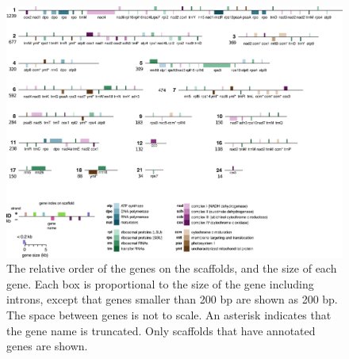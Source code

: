 \documentclass[
  12pt,
  oneside,
  openany]{book}
\begin{document}
\begin{figure}
\hypertarget{fig:mtgenes}{%
\centering
\includegraphics{whitespruce/mt-gene-order.png}
\caption[The relative order of the genes on the scaffolds, and the size of each gene.]{The relative order of the genes on the scaffolds, and the size of each gene. Each box is proportional to the size of the gene including introns, except that genes smaller than 200 bp are shown as 200 bp. The space between genes is not to scale. An asterisk indicates that the gene name is truncated. Only scaffolds that have annotated genes are shown.}\label{fig:mtgenes}
}
\end{figure}
\end{document}
